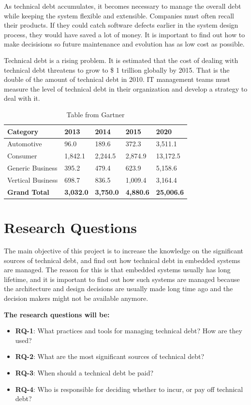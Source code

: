 As technical debt accumulates, it becomes necessary to manage the overall debt while keeping the system flexible and extensible. Companies must often recall their products. If they could catch software defects earlier in the system design process, they would have saved a lot of money. It is important to find out how to make decisisions so future maintenance and evolution has as low cost as possible. 


Technical debt is a rising problem. It is estimated that the cost of dealing with technical debt threatens to grow to \$ 1 trillion globally by 2015\cite{gartner2010}. That is the double of the amount of technical debt in 2010. IT management teams must measure the level of technical debt in their organization and develop a strategy to deal with it.

\begin{table}[H]
	\centering
	\begin{tabular}{ | l | l | l | l | l |}
	\hline
	\textbf{Category} & \textbf{2013} & \textbf{2014} & \textbf{2015} & \textbf{2020} \\ \hline
	Automotive & 96.0 & 189.6 & 372.3 & 3,511.1 \\ \hline
	Consumer & 1,842.1 & 2,244.5 & 2,874.9 & 13,172.5 \\ \hline
	Generic Business & 395.2 & 479.4 & 623.9 & 5,158.6 \\ \hline
	Vertical Business & 698.7 & 836.5 & 1,009.4 & 3,164.4 \\ \hline
	\textbf{Grand Total} & \textbf{3,032.0} & \textbf{3,750.0} & \textbf{4,880.6} & \textbf{25,006.6} \\
	\hline
	\end{tabular}
	\caption{Table from Gartner\cite{gartner}} \label{tab:table1}
\end{table}


\section{Research Questions}
The main objective of this project is to increase the knowledge on the significant sources of technical debt, and find out how technical debt in embedded systems are managed. The reason for this is that embedded systems usually has long lifetime, and it is important to find out how such systems are managed because the architecture and design decisions are usually made long time ago and the decision makers might not be available anymore. 

\textbf{The research questions will be:} 
\begin{itemize}
	\item \textbf{RQ-1}: What practices and tools for managing technical debt? How are they used?
	\item \textbf{RQ-2}: What are the most significant sources of technical debt?
	\item \textbf{RQ-3}: When should a technical debt be paid?
	\item \textbf{RQ-4}: Who is responsible for deciding whether to incur, or pay off technical debt?
\end{itemize}

